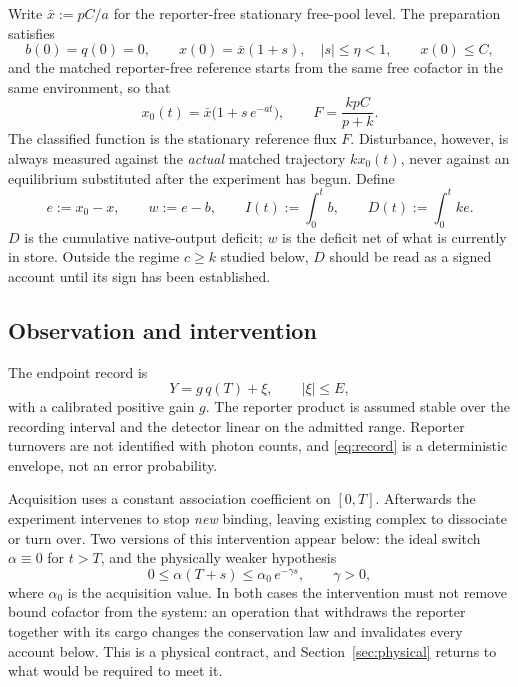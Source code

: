 \documentclass[11pt]{article}
\theoremstyle{definition}
\theoremstyle{remark}
\newcommand{\xb}{\bar{x}}
\begin{document}
Write $\xb:=pC/a$ for the reporter-free stationary free-pool level. The
preparation satisfies
\begin{equation}
b(0)=q(0)=0,\qquad x(0)=\xb(1+s),\quad |s|\le\eta<1,\qquad x(0)\le C,
\label{eq:prep}
\end{equation}
and the matched reporter-free reference starts from the same free cofactor in
the same environment, so that
\begin{equation}
x_0(t)=\xb\bigl(1+s\,e^{-at}\bigr),\qquad
F=\frac{kpC}{p+k}.
\label{eq:ref}
\end{equation}
The classified function is the stationary reference flux $F$. Disturbance,
however, is always measured against the \emph{actual} matched trajectory
$kx_0(t)$, never against an equilibrium substituted after the experiment has
begun. Define
\begin{equation}
e:=x_0-x,\qquad w:=e-b,\qquad
I(t):=\int_0^t b,\qquad D(t):=\int_0^t k e .
\label{eq:deficits}
\end{equation}
$D$ is the cumulative native-output deficit; $w$ is the deficit net of what is
currently in store. Outside the regime $c\ge k$ studied below, $D$ should be
read as a signed account until its sign has been established.

\subsection{Observation and intervention}

The endpoint record is
\begin{equation}
Y=g\,q(T)+\xi,\qquad |\xi|\le E,
\label{eq:record}
\end{equation}
with a calibrated positive gain $g$. The reporter product is assumed stable over
the recording interval and the detector linear on the admitted range. Reporter
turnovers are not identified with photon counts, and \eqref{eq:record} is a
deterministic envelope, not an error probability.

Acquisition uses a constant association coefficient on $[0,T]$. Afterwards the
experiment intervenes to stop \emph{new} binding, leaving existing complex to
dissociate or turn over. Two versions of this intervention appear below: the
ideal switch $\alpha\equiv0$ for $t>T$, and the physically weaker hypothesis
\begin{equation}
0\le\alpha(T+s)\le\alpha_0\,e^{-\gamma s},\qquad \gamma>0,
\label{eq:fade}
\end{equation}
where $\alpha_0$ is the acquisition value. In both cases the intervention must
not remove bound cofactor from the system: an operation that withdraws the
reporter together with its cargo changes the conservation law and invalidates
every account below. This is a physical contract, and Section~\ref{sec:physical}
returns to what would be required to meet it.
\end{document}
